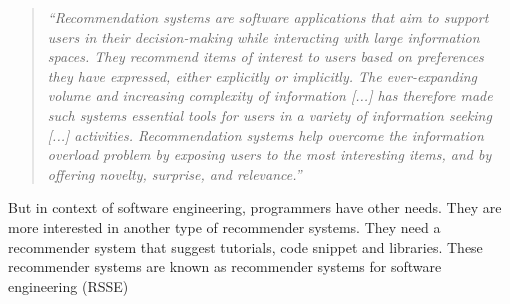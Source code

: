 \documentclass[12pt,mscthesis]{usiinfthesis}
\begin{document}
	  \blockquote{\textit{``Recommendation systems are software applications that aim to support users in their decision-making while interacting with large information spaces. They recommend items of interest to users based on preferences they have expressed, either explicitly or implicitly. The ever-expanding volume and increasing complexity of information [...] has therefore made such systems essential tools for users in a variety of information seeking [...] activities. Recommendation systems help overcome the information overload problem by exposing users to the most interesting items, and by offering novelty, surprise, and relevance.''}}

	  But in context of software engineering, programmers have other needs. They are more interested in another type of recommender systems. They need a recommender system that suggest tutorials, code snippet and libraries. These recommender systems are known as recommender systems for software engineering (RSSE)\\

\end{document}
